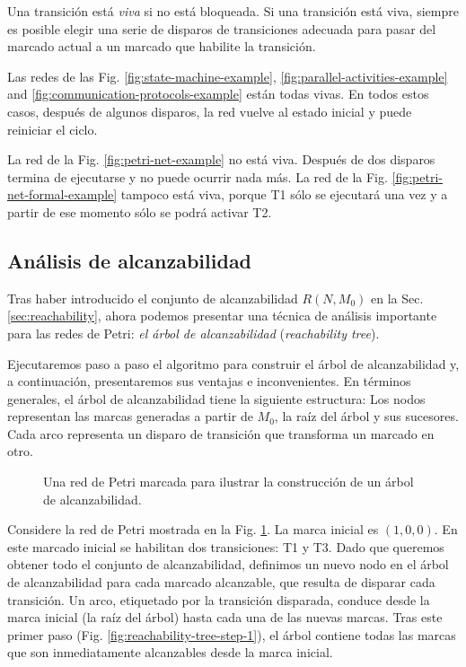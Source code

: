 Una transición está \emph{viva} si no está bloqueada.
Si una transición está viva, siempre es posible
elegir una serie de disparos de transiciones adecuada
para pasar del marcado actual a un marcado que habilite la transición.

Las redes de las Fig. \ref{fig:state-machine-example}, \ref{fig:parallel-activities-example}
and \ref{fig:communication-protocols-example} están todas vivas.
En todos estos casos, después de algunos disparos,
la red vuelve al estado inicial y puede reiniciar el ciclo.

La red de la Fig. \ref{fig:petri-net-example} no está viva.
Después de dos disparos termina de ejecutarse y no puede
ocurrir nada más.
La red de la Fig. \ref{fig:petri-net-formal-example} tampoco está viva,
porque T1 sólo se ejecutará una vez y a partir de ese momento sólo se podrá activar T2.

\subsection{Análisis de alcanzabilidad}

Tras haber introducido el conjunto de alcanzabilidad $R(N, M_0)$ en la Sec. \ref{sec:reachability},
ahora podemos presentar una técnica de análisis importante para las redes de Petri: \emph{el árbol de
      alcanzabilidad} (\textit{reachability tree}).

Ejecutaremos paso a paso el algoritmo para construir el árbol de alcanzabilidad y, a
continuación, presentaremos sus ventajas e inconvenientes. En términos generales, el árbol de
alcanzabilidad tiene la siguiente estructura: Los nodos representan las marcas generadas a partir
de $M_0$, la raíz del árbol y sus sucesores.
Cada arco representa un disparo de transición que transforma un marcado en otro.

\begin{figure}[!htb]
      \centering
      
      \caption{Una red de Petri marcada para ilustrar la construcción de un árbol de alcanzabilidad.}
      \label{fig:reachability-tree-example}
\end{figure}

Considere la red de Petri mostrada en la Fig. \ref{fig:reachability-tree-example}.
La marca inicial es $(1, 0, 0)$.
En este marcado inicial se habilitan dos transiciones: T1 y T3.
Dado que queremos obtener todo el conjunto de alcanzabilidad,
definimos un nuevo nodo en el árbol de alcanzabilidad para cada
marcado alcanzable, que resulta de disparar cada transición. Un arco, etiquetado por la
transición disparada, conduce desde la marca inicial (la raíz del árbol) hasta cada una de las
nuevas marcas. Tras este primer paso (Fig. \ref{fig:reachability-tree-step-1}),
el árbol contiene todas las marcas que son inmediatamente alcanzables desde la marca inicial.

